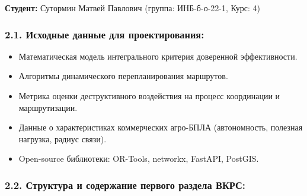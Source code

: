 \documentclass[14pt,a4paper]{extarticle}
\providecommand{\tightlist}{%
  \setlength{\itemsep}{0pt}\setlength{\parskip}{0pt}}
\begin{document}
\textbf{Студент:} Сутормин Матвей Павлович (группа: ИНБ-б-о-22-1, Курс: 4)

\hypertarget{ux438ux441ux445ux43eux434ux43dux44bux435-ux434ux430ux43dux43dux44bux435-ux434ux43bux44f-ux43fux440ux43eux435ux43aux442ux438ux440ux43eux432ux430ux43dux438ux44f}{%
\subsubsection{2.1. Исходные данные для проектирования:}\label{ux438ux441ux445ux43eux434ux43dux44bux435-ux434ux430ux43dux43dux44bux435-ux434ux43bux44f-ux43fux440ux43eux435ux43aux442ux438ux440ux43eux432ux430ux43dux438ux44f}}

\begin{itemize}
\tightlist
\item
  Математическая модель интегрального критерия доверенной эффективности.
\item
  Алгоритмы динамического перепланирования маршрутов.
\item
  Метрика оценки деструктивного воздействия на процесс координации и маршрутизации.
\item
  Данные о характеристиках коммерческих агро-БПЛА (автономность, полезная нагрузка, радиус связи).
\item
  Open-source библиотеки: OR-Tools, networkx, FastAPI, PostGIS.
\end{itemize}

\hypertarget{ux441ux442ux440ux443ux43aux442ux443ux440ux430-ux438-ux441ux43eux434ux435ux440ux436ux430ux43dux438ux435-ux43fux435ux440ux432ux43eux433ux43e-ux440ux430ux437ux434ux435ux43bux430-ux432ux43aux440ux441}{%
\subsubsection{2.2. Структура и содержание первого раздела ВКРС:}\label{ux441ux442ux440ux443ux43aux442ux443ux440ux430-ux438-ux441ux43eux434ux435ux440ux436ux430ux43dux438ux435-ux43fux435ux440ux432ux43eux433ux43e-ux440ux430ux437ux434ux435ux43bux430-ux432ux43aux440ux441}}
\end{document}
